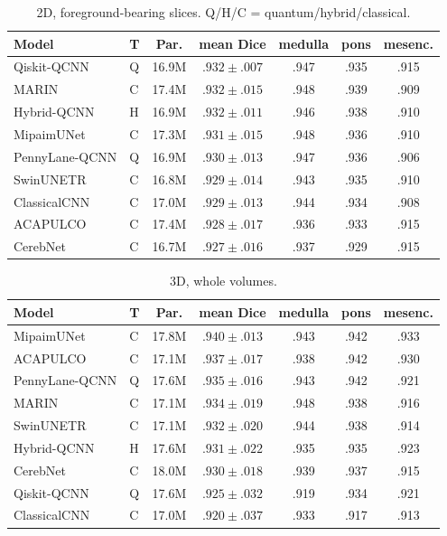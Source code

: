\documentclass[runningheads]{llncs}
\begin{document}
\begin{table}[t]\centering
\caption{2D, foreground-bearing slices. Q/H/C = quantum/hybrid/classical.}
\label{tab:2d}\small\setlength{\tabcolsep}{5pt}
\begin{tabular}{llccccc}
\toprule
Model & T & Par. & mean Dice & medulla & pons & mesenc.\\
\midrule
Qiskit-QCNN & Q & 16.9M & $.932{\pm}.007$ & .947 & .935 & .915\\
MARIN & C & 17.4M & $.932{\pm}.015$ & .948 & .939 & .909\\
Hybrid-QCNN & H & 16.9M & $.932{\pm}.011$ & .946 & .938 & .910\\
MipaimUNet & C & 17.3M & $.931{\pm}.015$ & .948 & .936 & .910\\
PennyLane-QCNN & Q & 16.9M & $.930{\pm}.013$ & .947 & .936 & .906\\
SwinUNETR & C & 16.8M & $.929{\pm}.014$ & .943 & .935 & .910\\
ClassicalCNN & C & 17.0M & $.929{\pm}.013$ & .944 & .934 & .908\\
ACAPULCO & C & 17.4M & $.928{\pm}.017$ & .936 & .933 & .915\\
CerebNet & C & 16.7M & $.927{\pm}.016$ & .937 & .929 & .915\\
\bottomrule
\end{tabular}
\end{table}

\begin{table}[t]\centering
\caption{3D, whole volumes.}
\label{tab:3d}\small\setlength{\tabcolsep}{5pt}
\begin{tabular}{llccccc}
\toprule
Model & T & Par. & mean Dice & medulla & pons & mesenc.\\
\midrule
MipaimUNet & C & 17.8M & $.940{\pm}.013$ & .943 & .942 & .933\\
ACAPULCO & C & 17.1M & $.937{\pm}.017$ & .938 & .942 & .930\\
PennyLane-QCNN & Q & 17.6M & $.935{\pm}.016$ & .943 & .942 & .921\\
MARIN & C & 17.1M & $.934{\pm}.019$ & .948 & .938 & .916\\
SwinUNETR & C & 17.1M & $.932{\pm}.020$ & .944 & .938 & .914\\
Hybrid-QCNN & H & 17.6M & $.931{\pm}.022$ & .935 & .935 & .923\\
CerebNet & C & 18.0M & $.930{\pm}.018$ & .939 & .937 & .915\\
Qiskit-QCNN & Q & 17.6M & $.925{\pm}.032$ & .919 & .934 & .921\\
ClassicalCNN & C & 17.0M & $.920{\pm}.037$ & .933 & .917 & .913\\
\bottomrule
\end{tabular}
\end{table}
\end{document}
